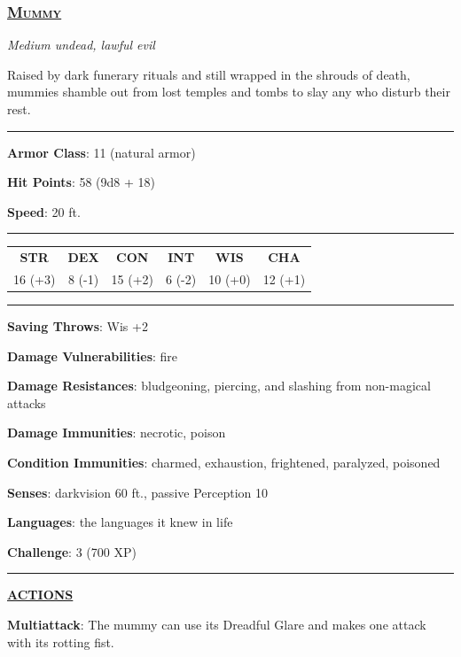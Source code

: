 \subsubsection*{\underline{\textsc{Mummy}}}
\noindent\emph{Medium undead, lawful evil} 

Raised by dark funerary rituals and still wrapped in the shrouds of death, mummies shamble out from lost temples and tombs to slay any who disturb their rest.

\noindent\rule{0.5\textwidth}{0.5pt}

\noindent\textbf{Armor Class}: 11 (natural armor)

\noindent\textbf{Hit Points}: 58 (9d8 + 18)

\noindent\textbf{Speed}: 20 ft.

\noindent\rule{0.5\textwidth}{0.5pt}

\begin{table}[H]
	\begin{tabular}{cccccc}
		\textbf{STR} & \textbf{DEX} & \textbf{CON} & \textbf{INT} & \textbf{WIS} & \textbf{CHA} \\
		16 (+3) & 8 (-1) & 15 (+2) & 6 (-2) & 10 (+0) & 12 (+1) \\
	\end{tabular}
\end{table}

\noindent\rule{0.5\textwidth}{0.5pt}

\noindent\textbf{Saving Throws}: Wis +2

\noindent\textbf{Damage Vulnerabilities}: fire

\noindent\textbf{Damage Resistances}: bludgeoning, piercing, and slashing from non-magical attacks

\noindent\textbf{Damage Immunities}: necrotic, poison

\noindent\textbf{Condition Immunities}: charmed, exhaustion, frightened, paralyzed, poisoned

\noindent\textbf{Senses}: darkvision 60 ft., passive Perception 10

\noindent\textbf{Languages}: the languages it knew in life

\noindent\textbf{Challenge}: 3 (700 XP)

\noindent\rule{0.5\textwidth}{0.5pt}

\noindent\underline{\textbf{ACTIONS}}

\noindent\textbf{Multiattack}: The mummy can use its Dreadful Glare and makes one attack with its rotting fist.

